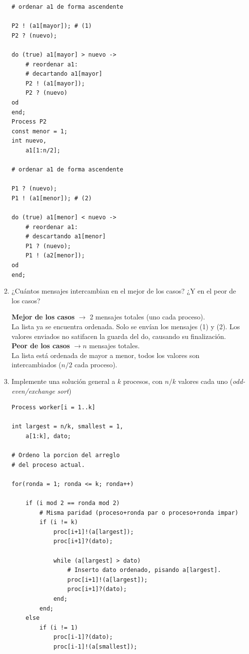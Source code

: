 \documentclass[a4paper, 10pt]{article}
\newenvironment{QandA}{
    \begin{enumerate}\bfseries}
    {\end{enumerate}
}
\newenvironment{answered}{\par\normalfont}{}
\begin{document}
\begin{QandA}
\begin{enumerate}[labelindent=0pt, align=left, leftmargin=0pt]
\begin{answered}
\begin{lstlisting}[multicols=2]
# ordenar a1 de forma ascendente

P2 ! (a1[mayor]); # (1)
P2 ? (nuevo);

do (true) a1[mayor] > nuevo ->
    # reordenar a1:
    # decartando a1[mayor]
    P2 ! (a1[mayor]);
    P2 ? (nuevo)
od
end;
Process P2
const menor = 1;
int nuevo,
    a1[1:n/2];

# ordenar a1 de forma ascendente

P1 ? (nuevo);
P1 ! (a1[menor]); # (2)

do (true) a1[menor] < nuevo ->
    # reordenar a1:
    # descartando a1[menor]
    P1 ? (nuevo);
    P1 ! (a2[menor]);
od
end;
\end{lstlisting}
\end{answered}
\item ¿Cuántos mensajes intercambian en el mejor de los casos? ¿Y en el peor de los casos? 
\begin{answered}
\textbf{Mejor de los casos} $\rightarrow$ 2 mensajes totales (uno cada proceso).
\\
La lista ya se encuentra ordenada. Solo se envían los mensajes (1) y (2). Los valores enviados no satifacen la guarda del do, causando su finalización.
\\
\textbf{Peor de los casos} $\rightarrow n$ mensajes totales.
\\
La lista está ordenada de mayor a menor, todos los valores son intercambiados ($n/2$ cada proceso).
\end{answered}
\item Implemente una solución general a $k$ procesos, con $n/k$ valores cada uno (\emph{odd-even/exchange sort})
\begin{answered}
\begin{lstlisting}
Process worker[i = 1..k]

int largest = n/k, smallest = 1,
    a[1:k], dato;

# Ordeno la porcion del arreglo
# del proceso actual.

for(ronda = 1; ronda <= k; ronda++)

    if (i mod 2 == ronda mod 2)
        # Misma paridad (proceso+ronda par o proceso+ronda impar)
        if (i != k)
            proc[i+1]!(a[largest]);
            proc[i+1]?(dato);

            while (a[largest] > dato)
                # Inserto dato ordenado, pisando a[largest].
                proc[i+1]!(a[largest]);
                proc[i+1]?(dato);
            end;
        end;
    else
        if (i != 1)
            proc[i-1]?(dato);
            proc[i-1]!(a[smallest]);


\end{lstlisting}
\end{answered}
\end{enumerate}
\end{QandA}
\end{document}

